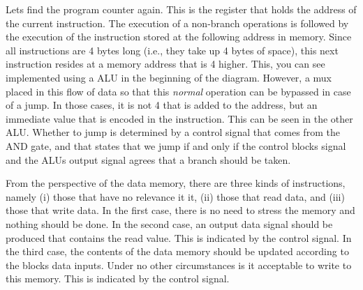 Lets find the program counter again. This is the register that holds the address of the current instruction. The execution of a non-branch operations is followed by the execution of the instruction stored at the following address in memory. Since all instructions are 4 bytes long (i.e., they take up 4 bytes of space), this next instruction resides at a memory address that is 4 higher. This, you can see implemented using a \say{+} ALU in the beginning of the diagram. However, a mux placed in this flow of data so that this \textsl{normal} operation can be bypassed in case of a jump. In those cases, it is not 4 that is added to the address, but an immediate value that is encoded in the instruction. This can be seen in the other \say{+} ALU. Whether to jump is determined by a control signal that comes from the AND gate, and that states that we jump if and only if the control blocks  signal and the ALUs output signal agrees that a branch should be taken.

From the perspective of the data memory, there are three kinds of instructions, namely (i) those that have no relevance it it, (ii) those that read data, and (iii) those that write data. In the first case, there is no need to stress the memory and nothing should be done. In the second case, an output data signal should be produced that contains the read value. This is indicated by the  control signal. In the third case, the contents of the data memory should be updated according to the blocks data inputs. Under no other circumstances is it acceptable to write to this memory. This is indicated by the  control signal.


